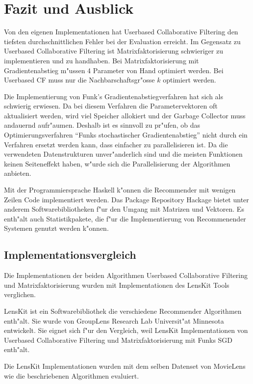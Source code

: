 \documentclass[a4paper, 12pt]{article}
\begin{document}
\section{Fazit und Ausblick}
\label{sec:fazit}

Von den eigenen Implementationen hat Userbased Collaborative Filtering den tiefsten durchschnittlichen Fehler bei der Evaluation erreicht. Im Gegensatz zu Userbased Collaborative Filtering ist Matrixfaktorisierung schwieriger zu implementieren und zu handhaben. Bei Matrixfaktorisierung mit Gradientenabstieg m"ussen 4 Parameter von Hand optimiert werden. Bei Userbased CF muss nur die Nachbarschaftsgr"osse $k$ optimiert werden.

Die Implementierung von Funk's Gradientenabstiegverfahren hat sich als schwierig erwiesen. Da bei diesem Verfahren die Parametervektoren oft aktualisiert werden, wird viel Speicher allokiert und der Garbage Collector muss andauernd aufr"aumen. Deshalb ist es sinnvoll zu pr"ufen, ob das Optimierungsverfahren ``Funks stochastischer Gradientenabstieg'' nicht durch ein Verfahren ersetzt werden kann, dass einfacher zu parallelisieren ist. Da die verwendeten Datenstrukturen unver"anderlich sind und die meisten Funktionen keinen Seiteneffekt haben, w"urde sich die Parallelisierung der Algorithmen anbieten.

Mit der Programmiersprache Haskell k"onnen die Recommender mit wenigen Zeilen Code implementiert werden. Das Package Repository Hackage bietet unter anderem Softwarebibliotheken f"ur den Umgang mit Matrizen und Vektoren. Es enth"alt auch Statistikpakete, die f"ur die Implementierung von Recommenender Systemen genutzt werden k"onnen.

\subsection{Implementationsvergleich}
\label{sec:compare}

Die Implementationen der beiden Algorithmen Userbased Collaborative Filtering und Matrixfaktorisierung wurden mit Implementationen des LensKit Tools verglichen. 

LensKit ist ein Softwarebibliothek die verschiedene Recommender Algorithmen enth"alt. Sie wurde von GroupLens Research Lab Universit"at Minnesota \cite{ekstrandlk11} entwickelt. Sie eignet sich f"ur den Vergleich, weil LensKit Implementationen von Userbased Collaborative Filtering und Matrixfaktorisierung mit Funks SGD enth"alt.

Die LensKit Implementationen wurden mit dem selben Datenset von MovieLens wie die beschriebenen Algorithmen evaluiert.
\end{document}

